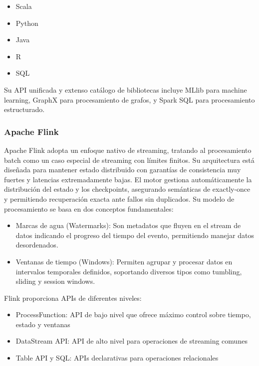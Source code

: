 \begin{itemize}
    \item Scala
    \item Python
    \item Java 
    \item R
    \item SQL
\end{itemize}

Su API unificada y extenso catálogo de bibliotecas incluye MLlib para machine learning, GraphX para procesamiento de
grafos, y Spark SQL para procesamiento estructurado.

\subsubsection{Apache Flink}

Apache Flink adopta un enfoque nativo de streaming, tratando al procesamiento batch como un caso especial de streaming
con límites finitos. Su arquitectura está diseñada para mantener estado distribuido con garantías de consistencia muy
fuertes y latencias extremadamente bajas. El motor gestiona automáticamente la distribución del estado y los checkpoints,
asegurando semánticas de exactly-once y permitiendo recuperación exacta ante fallos sin duplicados.
Su modelo de procesamiento se basa en dos conceptos fundamentales:

\begin{itemize}
    \item Marcas de agua (Watermarks): Son metadatos que fluyen en el stream de datos indicando el progreso del tiempo del evento,
    permitiendo manejar datos desordenados.
    \item Ventanas de tiempo (Windows): Permiten agrupar y procesar datos en intervalos temporales definidos, soportando diversos
    tipos como tumbling, sliding y session windows. 
\end{itemize}

Flink proporciona APIs de diferentes niveles:

\begin{itemize}
    \item ProcessFunction: API de bajo nivel que ofrece máximo control sobre tiempo, estado y ventanas
    \item DataStream API: API de alto nivel para operaciones de streaming comunes
    \item Table API y SQL: APIs declarativas para operaciones relacionales   
\end{itemize}

